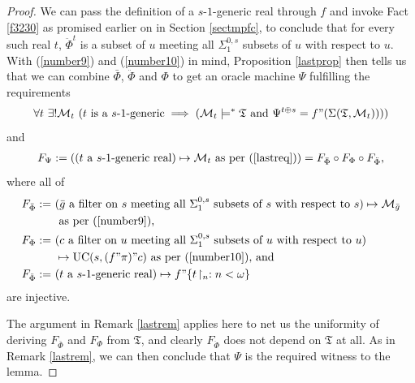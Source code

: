 \documentclass[12pt, twoside]{memoir}
\numberwithin{equation}{section}
\theoremstyle{definition}
\theoremstyle{remark}
\theoremstyle{definition}
\theoremstyle{definition}
\theoremstyle{definition}
\theoremstyle{remark}
\begin{document}
\begin{proof}
We can pass the definition of a $s$-$1$-generic real through $f$ and invoke Fact \ref{f3230} as promised earlier on in Section \ref{sectmpfc}, to conclude that for every such real $t$, $\ddot{\Phi}^t$ is a subset of $u$ meeting all $\Sigma^{0, s}_1$ subsets of $u$ with respect to $u$. With (\ref{number9}) and (\ref{number10}) in mind, Proposition \ref{lastprop} then tells us that we can combine $\bar{\Phi}$, $\ddot{\Phi}$ and $\Phi$ to get an oracle machine $\Psi$ fulfilling the requirements 
\begin{align}\label{lastreq}
    \forall t \ \exists ! \mathcal{M}_t \ (t \text{ is a } s \text{-} 1 \text{-generic} \implies (\mathcal{M}_t \models^* \mathfrak{T} \text{ and } \Psi^{t \oplus s} = f" (\Sigma(\mathfrak{T}, \mathcal{M}_t))))
\end{align}
and 
\begin{align*}
    F_{\Psi} := ((t \text{ a } s \text{-} 1 \text{-generic real}) \mapsto \mathcal{M}_t \text{ as per (\ref{lastreq})}) = F_{\bar{\Phi}} \circ F_{\Phi} \circ F_{\ddot{\Phi}} \text{,}
\end{align*}
where all of 
\begin{align*}
    F_{\bar{\Phi}} := \ & (\bar{g} \text{ a filter on } s \text{ meeting all } \Sigma^{0, s}_1 \text{ subsets of } s \text{ with respect to } s) \mapsto \mathcal{M}_{\bar{g}} \\
    & \text{ as per (\ref{number9}),} \\ 
    F_{\Phi} := \ & (c \text{ a filter on } u \text{ meeting all } \Sigma^{0, s}_1 \text{ subsets of } u \text{ with respect to } u) \\ 
    & \mapsto \mathrm{UC}(s, (f" \pi)" c) \text{ as per (\ref{number10}), and} \\
    F_{\ddot{\Phi}} := \ & (t \text{ a } s \text{-} 1 \text{-generic real}) \mapsto f" \{t \! \restriction_n : n < \omega\} 
\end{align*}
are injective.

The argument in Remark \ref{lastrem} applies here to net us the uniformity of deriving $F_{\bar{\Phi}}$ and $F_{\Phi}$ from $\mathfrak{T}$, and clearly $F_{\ddot{\Phi}}$ does not depend on $\mathfrak{T}$ at all. As in Remark \ref{lastrem}, we can then conclude that $\Psi$ is the required witness to the lemma.
\end{proof}
\end{document}
